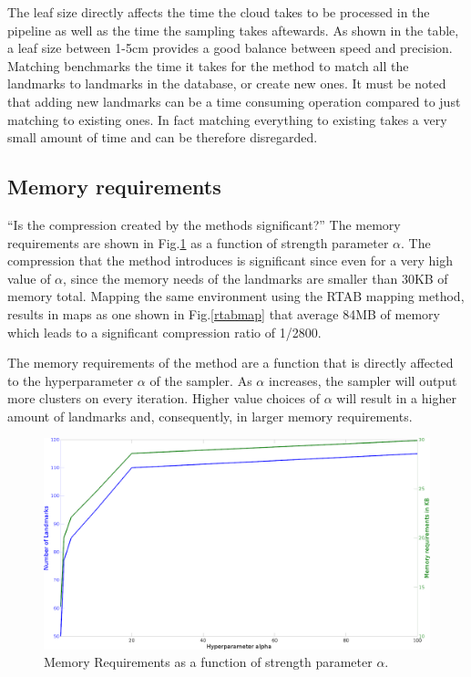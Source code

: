 \documentclass[twoside,hidelinks]{article}
\begin{document}
The leaf size directly affects the time the cloud takes to be processed in the pipeline as well as the time the sampling takes aftewards. As shown in the table, a leaf size between 1-5cm provides a good balance between speed and precision. Matching benchmarks the time it takes for the method to match all the landmarks to landmarks in the database, or create new ones. It must be noted that adding new landmarks can be a time consuming operation compared to just matching to existing ones. In fact matching everything to existing takes a very small amount of time and can be therefore disregarded.

\subsection{Memory requirements}
\label{reqs}
``Is the compression created by the methods significant?''
The memory requirements are shown in Fig.\ref{memReq} as a function of strength parameter $\alpha$. The compression that the method introduces is significant since even for a very high value of $\alpha$, since the memory needs of the landmarks are smaller than 30KB of memory total. Mapping the same environment using the RTAB mapping method, results in maps  as one shown in Fig.\ref{rtabmap} that average 84MB of memory which leads to a significant compression ratio of 1/2800.

The memory requirements of the method are a function that is directly affected to the hyperparameter $\alpha$ of the sampler. As $\alpha$ increases, the sampler will output more clusters on every iteration. Higher value choices of $\alpha$ will result in a higher amount of landmarks and, consequently, in larger memory requirements.

\begin{figure}[ht!]
  \centering
    \includegraphics[width=.8\textwidth]{memoryRequirements2}
    \caption{Memory Requirements as a function of strength parameter $\alpha$.}
  \label{memReq}
\end{figure}
\end{document}
